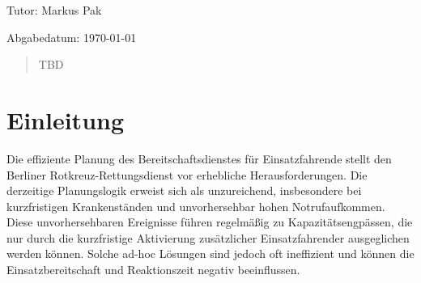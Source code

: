 \documentclass[%
pdftex,
oneside,			%
11pt,				%
parskip=half,		%
headheight = 12pt,	%
headsepline,		%
footsepline,		%
footheight = 16pt,	%
abstracton,		%
DIV=calc,		%
BCOR=8mm,		%
headinclude=false,	%
footinclude=false,	%
listof=totoc,		%
toc=bibliography,	%
]{scrreprt}	%
\def \datumAbgabe {\today}
\def \tutor {Markus Pak}
\begin{document}
\begin{titlepage}
        \vspace*{10mm}
        
        \begin{large} 
        \begin{center}
        Tutor: \tutor 
        \end{center}
        \end{large}         
        \vspace*{-6mm}
        
        \begin{large} 
        \begin{center}
        Abgabedatum: \datumAbgabe
        \end{center}
        \end{large} 
\end{titlepage}

\renewcommand{\abstractname}{Abstract}
\begin{abstract}

    TBD



\end{abstract}

\begin{spacing}{1.1}
    \begingroup
    
        \renewcommand*{\chapterpagestyle}{empty}
        \pagestyle{empty}

        \setcounter{tocdepth}{3}
        
        \tableofcontents
        \clearpage
    \endgroup
\end{spacing}
\newpage

\cleardoublepage 
\listoffigures
\clearpage

\lstlistoflistings %
\clearpage


\chapter{Einleitung}


    Die effiziente Planung des Bereitschaftsdienstes für Einsatzfahrende stellt den Berliner Rotkreuz-Rettungsdienst vor erhebliche Herausforderungen. 
    Die derzeitige Planungslogik erweist sich als unzureichend, insbesondere bei kurzfristigen Krankenständen und unvorhersehbar hohen Notrufaufkommen. 
    Diese unvorhersehbaren Ereignisse führen regelmäßig zu Kapazitätsengpässen, die nur durch die kurzfristige Aktivierung zusätzlicher Einsatzfahrender ausgeglichen werden können. 
    Solche ad-hoc Lösungen sind jedoch oft ineffizient und können die Einsatzbereitschaft und Reaktionszeit negativ beeinflussen.
\end{document}

